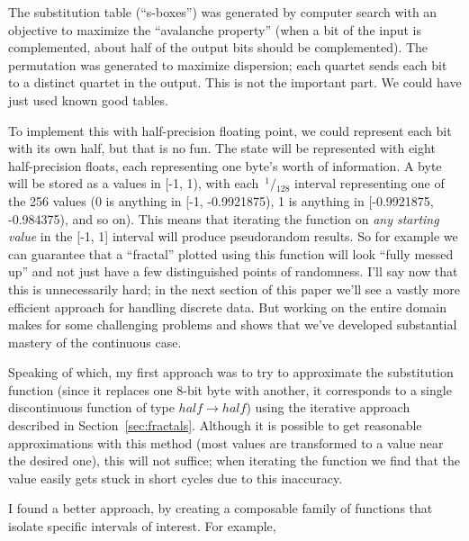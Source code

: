 \documentclass[twocolumn]{article}
\newcommand\sfrac[2]{\!{}\,^{#1}\!/{}\!_{#2}}
\begin{document}
The substitution table (``s-boxes'') was generated by computer search
with an objective to maximize the ``avalanche property'' (when a bit
of the input is complemented, about half of the output bits should be
complemented). The permutation was generated to maximize dispersion;
each quartet sends each bit to a distinct quartet in the output. This
is not the important part. We could have just used known good tables.

To implement this with half-precision floating point, we could
represent each bit with its own half, but that is no fun. The state
will be represented with eight half-precision floats, each
representing one byte's worth of information. A byte will be stored as
a values in [-1, 1), with each $\sfrac{1}{128}$ interval representing
one of the 256 values (0 is anything in [-1, -0.9921875), 1 is
anything in [-0.9921875, -0.984375), and so on). This means that
iterating the function on {\em any starting value} in the [-1, 1]
interval will produce pseudorandom results. So for example
we can guarantee that a ``fractal'' plotted using this function
will look ``fully messed up'' and not just have a few
distinguished points of randomness.
I'll say now that this is unnecessarily hard; in the next
section of this paper we'll see a vastly more efficient
approach for handling discrete data. But working on the entire domain
makes for some challenging problems and shows that we've developed
substantial mastery of the continuous case.

Speaking of which, my first approach was to try to approximate the
substitution function (since it replaces one 8-bit byte with another,
it corresponds to a single discontinuous function of type $half
\rightarrow half$) using the iterative approach described in
Section~\ref{sec:fractals}. Although it is possible to get reasonable
approximations with this method (most values are transformed to a
value near the desired one), this will not suffice; when iterating the
function we find that the value easily gets stuck in short cycles due
to this inaccuracy.

I found a better approach, by creating a composable family of functions
that isolate specific intervals of interest. For example,
\end{document}
